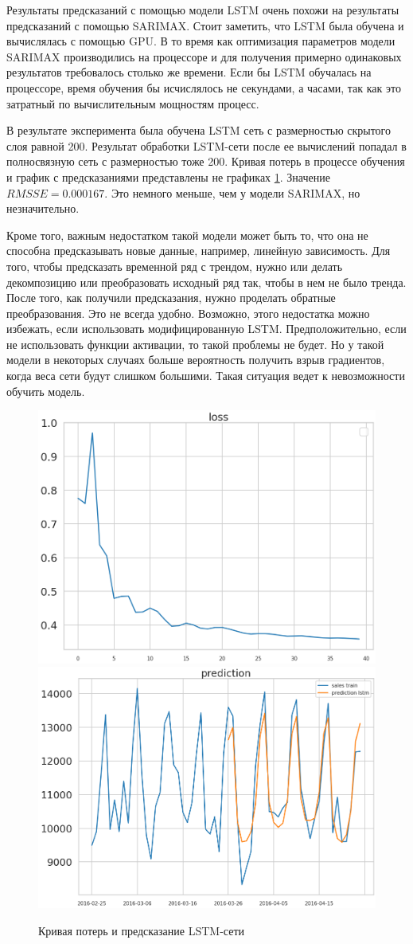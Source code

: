 Результаты предсказаний с помощью модели LSTM очень похожи на результаты предсказаний
с помощью SARIMAX. Стоит заметить, что LSTM была обучена и вычислялась с помощью GPU.
В то время как оптимизация параметров модели SARIMAX производились на процессоре и
для получения примерно одинаковых результатов требовалось столько же времени.
Если бы LSTM обучалась на процессоре, время обучения бы исчислялось не секундами, а часами,
так как это затратный по вычислительным мощностям процесс.

В результате эксперимента была обучена LSTM сеть с размерностью скрытого слоя равной 200.
Результат обработки LSTM-сети после ее вычислений попадал в полносвязную сеть с размерностью
тоже 200. Кривая потерь в процессе обучения и график с предсказаниями представлены не графиках \ref{img:lstm_forecast}.
Значение $ RMSSE = 0.000167 $. Это немного меньше, чем у модели SARIMAX, но незначительно.

Кроме того, важным недостатком такой модели может быть то, что она не
способна предсказывать новые данные, например, линейную зависимость.
Для того, чтобы предсказать временной ряд с трендом, нужно или делать
декомпозицию или преобразовать исходный ряд так, чтобы в нем не было тренда.
После того, как получили предсказания, нужно проделать обратные преобразования.
Это не всегда удобно. Возможно, этого недостатка можно избежать,
если использовать модифицированную LSTM. Предположительно, если не использовать
функции активации, то такой проблемы не будет. Но у такой модели
в некоторых случаях больше вероятность получить взрыв градиентов, когда
веса сети будут слишком большими. Такая ситуация ведет к невозможности обучить модель.


\def\figurename{Рис}
\begin{figure}[t]
	\centering
	\includegraphics[width=0.4\columnwidth]{./img/lstm_loss.png}
	\includegraphics[width=0.4\columnwidth]{./img/lstm_prediction.png}
	\caption{Кривая потерь и предсказание LSTM-сети}
	\label{img:lstm_forecast}
\end{figure}

